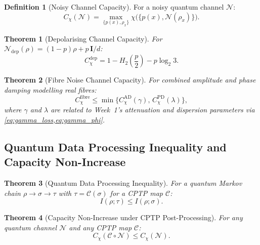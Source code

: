\documentclass[journal,twocolumn]{IEEEtran}
\theoremstyle{definition}
\newtheorem{definition}{Definition}[section]
\theoremstyle{plain}
\newtheorem{theorem}{Theorem}[section]
\begin{document}
\begin{definition}[Noisy Channel Capacity]
For a noisy quantum channel $\mathcal{N}$:
\begin{equation}
  C_\chi(\mathcal{N})=\max_{\{p(x),\rho_x\}}
  \chi\bigl(\{p(x),\mathcal{N}(\rho_x)\}\bigr).
\end{equation}
\end{definition}

\begin{theorem}[Depolarising Channel Capacity]
For $\mathcal{N}_{\mathrm{dep}}(\rho)=(1-p)\rho+p\,\mathbf{I}/d$:
\begin{equation}
  C_\chi^{\mathrm{dep}}=1-H_2\!\left(\frac{p}{2}\right)-p\log_2 3.
\end{equation}
\end{theorem}

\begin{theorem}[Fibre Noise Channel Capacity]
For combined amplitude and phase damping modelling real fibres:
\begin{equation}
  C_\chi^{\mathrm{fibre}}\le
  \min\bigl\{C_\chi^{\mathrm{AD}}(\gamma),\,C_\chi^{\mathrm{PD}}(\lambda)\bigr\},
\end{equation}
where $\gamma$ and $\lambda$ are related to Week~1's attenuation and
dispersion parameters via \cref{eq:gamma_loss,eq:gamma_phi}.
\end{theorem}

\subsection{Quantum Data Processing Inequality and Capacity Non-Increase}

\begin{theorem}[Quantum Data Processing Inequality]
For a quantum Markov chain $\rho\to\sigma\to\tau$ with
$\tau=\mathcal{C}(\sigma)$ for a CPTP map $\mathcal{C}$:
\begin{equation}
  I(\rho;\tau)\le I(\rho;\sigma).
\end{equation}
\end{theorem}

\begin{theorem}[Capacity Non-Increase under CPTP Post-Processing]
\label{thm:capacity_nonincrease}
For any quantum channel $\mathcal{N}$ and any CPTP map $\mathcal{C}$:
\begin{equation}
  C_\chi(\mathcal{C}\circ\mathcal{N})\le C_\chi(\mathcal{N}).
\end{equation}
\end{theorem}
\end{document}
